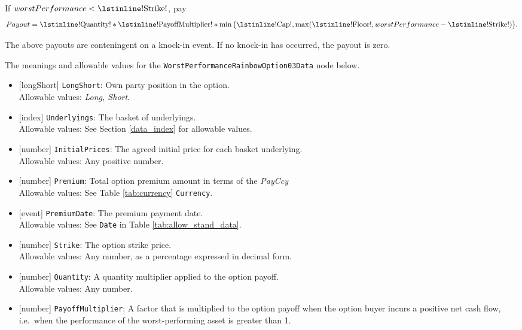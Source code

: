 If $worstPerformance < \text{\lstinline!Strike!}$, pay
\begin{equation*}
  Payout = \text{\lstinline!Quantity!} * \text{\lstinline!PayoffMultiplier!} * \min\big(\text{\lstinline!Cap!}, \max(\text{\lstinline!Floor!}, worstPerformance - \text{\lstinline!Strike!})\big).
\end{equation*}

The above payouts are conteningent on a knock-in event. If no knock-in has occurred, the payout is zero.

The meanings and allowable values for the \lstinline!WorstPerformanceRainbowOption03Data! node below.

\begin{itemize} 
  \item{}[longShort] \lstinline!LongShort!: Own party position in the option. \\
  Allowable values: \emph{Long, Short}.
  \item{}[index] \lstinline!Underlyings!: The basket of underlyings. \\
  Allowable values: See Section \ref{data_index} for allowable values.
  \item{}[number] \lstinline!InitialPrices!: The agreed initial price for each basket underlying. \\
  Allowable values: Any positive number.
  \item{}[number] \lstinline!Premium!: Total option premium amount in terms of the \emph{PayCcy} \\
  Allowable values: See Table \ref{tab:currency} \lstinline!Currency!.
  \item{}[event] \lstinline!PremiumDate!: The premium payment date. \\
  Allowable values: See \lstinline!Date! in Table \ref{tab:allow_stand_data}.
  \item{}[number] \lstinline!Strike!: The option strike price. \\
  Allowable values: Any number, as a percentage expressed in decimal form.
  \item{}[number] \lstinline!Quantity!: A quantity multiplier applied to the option payoff. \\
  Allowable values: Any number.
  \item{}[number] \lstinline!PayoffMultiplier!: A factor that is multiplied to the option payoff when the option buyer incurs 
  a positive net cash flow, i.e.\ when the performance of the worst-performing asset is greater than 1. \\

\end{itemize}
